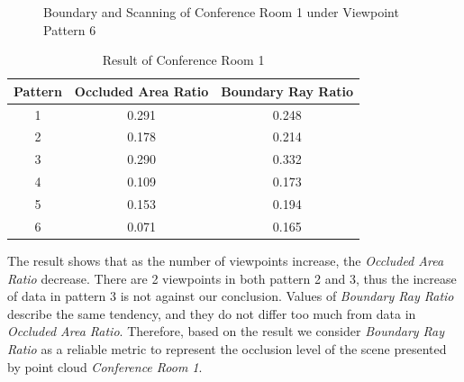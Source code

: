 \documentclass[11pt, a4paper,oneside,chapterprefix=false]{scrbook}
\begin{document}
\begin{figure}[H]
    \centering
      \label{fig:conf1 b 6} \hfill
     \label{fig:conf1 s 6}
    \caption{Boundary and Scanning of Conference Room 1 under Viewpoint Pattern 6}
    \label{fig:conf1 6}
\end{figure}

\begin{table}[H]
    \centering
    \begin{tabular}{|c|c|c|}
        \hline
        \textbf{Pattern} & \textbf{Occluded Area Ratio} & \textbf{Boundary Ray Ratio} \\
        \hline
        1 & 0.291 & 0.248 \\
        2 & 0.178 & 0.214 \\
		3 & 0.290 & 0.332 \\
		4 & 0.109 & 0.173 \\
        5 & 0.153 & 0.194 \\
        6 & 0.071 & 0.165 \\
        \hline
    \end{tabular}
    \caption{Result of Conference Room 1}
    \label{tab:result of conference room 1}
\end{table}

The result shows that as the number of viewpoints increase, the \emph{Occluded Area Ratio} decrease. There are 2 viewpoints in both pattern 2 and 3, thus the increase of data in pattern 3 is not against our conclusion. Values of \emph{Boundary Ray Ratio} describe the same tendency, and they do not differ too much from data in \emph{Occluded Area Ratio}. Therefore, based on the result we consider \emph{Boundary Ray Ratio} as a reliable metric to represent the occlusion level of the scene presented by point cloud \emph{Conference Room 1}.       
\end{document}
